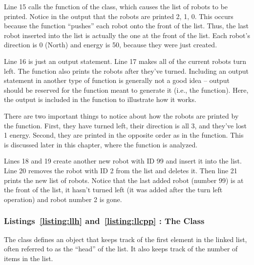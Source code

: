 
Line 15 calls the  function of the  class, which causes the list of robots to be printed.   Notice in the output that the robots are printed 2, 1, 0.  This occurs because the  function ``pushes'' each robot onto the front of the list.  Thus, the last robot inserted into the list is actually the one at the front of the list.  Each robot's direction is 0 (North) and energy is 50, because they were just created.


Line 16 is just an output statement.  Line 17 makes all of the current robots turn left.  The  function also prints the robots after they've turned.   Including an output statement in another type of function is generally not a good idea -- output should be reserved for the function meant to generate it (i.e., the  function).  Here, the output is included in the  function to illustrate how it works.

There are two important things to notice about how the robots are printed by the  function.  First, they have turned left, their direction is all 3, and they've lost 1 energy.  Second, they are printed in the opposite order as in the  function.  This is discussed later in this chapter, where the  function is analyzed.

Lines 18 and 19 create another new robot with ID 99 and insert it into the list.  Line 20 removes the robot with ID 2 from the list and deletes it.  Then line 21 prints the new list of robots.  Notice that the last added robot (number 99) is at the front of the list, it hasn't turned left (it was added after the turn left operation) and robot number 2 is gone.

\subsubsection{Listings~\ref{listing:llh} and~\ref{listing:llcpp} : The  Class}

The  class defines an object that keeps track of the first element in the linked list, often referred to as the ``head'' of the list.  It also keeps track of the number of items in the list.


